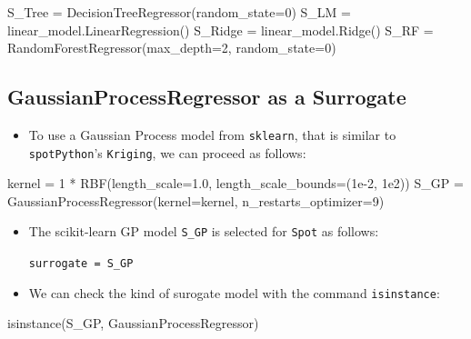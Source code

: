 \documentclass[
  letterpaper,
  DIV=11,
  numbers=noendperiod]{scrreprt}
\newenvironment{Shaded}{\begin{snugshade}}{\end{snugshade}}
\newcommand{\BuiltInTok}[1]{\textcolor[rgb]{0.00,0.23,0.31}{#1}}
\newcommand{\DecValTok}[1]{\textcolor[rgb]{0.68,0.00,0.00}{#1}}
\newcommand{\FloatTok}[1]{\textcolor[rgb]{0.68,0.00,0.00}{#1}}
\newcommand{\NormalTok}[1]{\textcolor[rgb]{0.00,0.23,0.31}{#1}}
\newcommand{\OperatorTok}[1]{\textcolor[rgb]{0.37,0.37,0.37}{#1}}
\providecommand{\tightlist}{%
  \setlength{\itemsep}{0pt}\setlength{\parskip}{0pt}}\usepackage{longtable,booktabs,array}
\begin{document}
\begin{Shaded}
\begin{Highlighting}[]
\NormalTok{S\_Tree }\OperatorTok{=}\NormalTok{ DecisionTreeRegressor(random\_state}\OperatorTok{=}\DecValTok{0}\NormalTok{)}
\NormalTok{S\_LM }\OperatorTok{=}\NormalTok{ linear\_model.LinearRegression()}
\NormalTok{S\_Ridge }\OperatorTok{=}\NormalTok{ linear\_model.Ridge()}
\NormalTok{S\_RF }\OperatorTok{=}\NormalTok{ RandomForestRegressor(max\_depth}\OperatorTok{=}\DecValTok{2}\NormalTok{, random\_state}\OperatorTok{=}\DecValTok{0}\NormalTok{)}
\end{Highlighting}
\end{Shaded}

\subsection{GaussianProcessRegressor as a
Surrogate}\label{gaussianprocessregressor-as-a-surrogate}

\begin{itemize}
\tightlist
\item
  To use a Gaussian Process model from \texttt{sklearn}, that is similar
  to \texttt{spotPython}'s \texttt{Kriging}, we can proceed as follows:
\end{itemize}

\begin{Shaded}
\begin{Highlighting}[]
\NormalTok{kernel }\OperatorTok{=} \DecValTok{1} \OperatorTok{*}\NormalTok{ RBF(length\_scale}\OperatorTok{=}\FloatTok{1.0}\NormalTok{, length\_scale\_bounds}\OperatorTok{=}\NormalTok{(}\FloatTok{1e{-}2}\NormalTok{, }\FloatTok{1e2}\NormalTok{))}
\NormalTok{S\_GP }\OperatorTok{=}\NormalTok{ GaussianProcessRegressor(kernel}\OperatorTok{=}\NormalTok{kernel, n\_restarts\_optimizer}\OperatorTok{=}\DecValTok{9}\NormalTok{)}
\end{Highlighting}
\end{Shaded}

\begin{itemize}
\item
  The scikit-learn GP model \texttt{S\_GP} is selected for \texttt{Spot}
  as follows:

  \texttt{surrogate\ =\ S\_GP}
\item
  We can check the kind of surogate model with the command
  \texttt{isinstance}:
\end{itemize}

\begin{Shaded}
\begin{Highlighting}[]
\BuiltInTok{isinstance}\NormalTok{(S\_GP, GaussianProcessRegressor) }
\end{Highlighting}
\end{Shaded}
\end{document}
